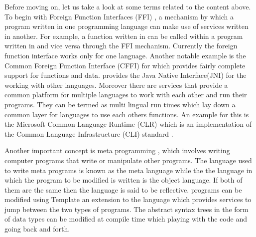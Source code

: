 \documentclass[thesis-solanki.tex]{subfiles}
\begin{document}
Before moving on, let us take a look at some terms related to the content above.
To begin with Foreign Function Interfaces (FFI) \cite{website:ffiwiki}, a mechanism by which a program written in
one programming language can make use of services written in another.
For example, a function written in  can be called within a program written in  and
vice versa through the FFI mechanism.
Currently the  foreign function interface works only for one language.
Another notable example is the Common Foreign Function Interface (CFFI) \cite{website:commonlisp} for
 which provides fairly complete support for  functions and data.
 provides the Java Native Interface(JNI) for the working with other languages.
Moreover there are services that provide a common platform for multiple languages to work with each other and run
their programs.
They can be termed as multi lingual run times which lay down a common layer for languages to use each others
functions.
An example for this is the Microsoft Common Language Runtime (CLR) \cite{website:clrwiki} which is an
implementation of the Common Language Infrastructure (CLI) standard \cite{website:cliwiki}.

Another important concept is meta programming \cite{website:metaprogwiki}, which involves writing computer programs
that write or manipulate other programs.
The language used to write meta programs is known as the meta language while the the language in which the program
to be modified is written is the object language.
If both of them are the same then the language is said to be reflective.
 programs can be modified using Template  \cite{website:templatehaskell} an
extension to the language which provides services to jump between the two types of programs.
The abstract syntax trees in the form of  data types can be modified at compile time which
playing with the code and going back and forth.
\end{document}
